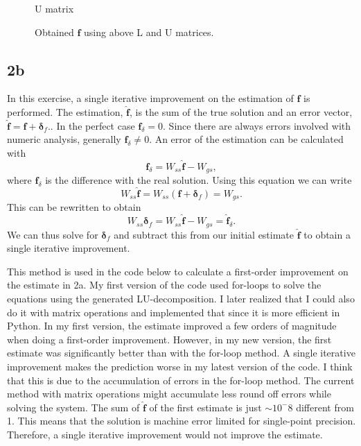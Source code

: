 \begin{figure}[!ht]
    \centering
    
    \caption{U matrix}
    \label{fig:2a_U}
\end{figure}

\begin{figure}[!ht]
    \centering
    
    \caption{Obtained $\mathbf{f}$ using above L and U matrices.}
    \label{fig:2a_f}
\end{figure}

\newpage

\subsection*{2b}
In this exercise, a single iterative improvement on the estimation of $\mathbf{f}$ is performed. The estimation, $\hat{\mathbf{f}}$, is the sum of the true solution and an error vector, $\hat{\mathbf{f}} = \mathbf{f} + \mathbf{\delta}_f.$. In the perfect case $\mathbf{f}_\delta=0$. Since there are always errors involved with numeric analysis, generally $\mathbf{f}_\delta\neq 0$. An error of the estimation can be calculated with
\begin{equation}
    \mathbf{f}_\delta = W_{ss}\mathbf{\hat{f}} - W_{gs},
\end{equation}
where $\mathbf{f}_\delta$ is the difference with the real solution. Using this equation we can write
\begin{equation}
    W_{ss}\hat{\mathbf{f}} = W_{ss}(\mathbf{f} + \mathbf{\delta}_f) = W_{gs}.
\end{equation}
This can be rewritten to obtain
\begin{equation}
    W_{ss}\mathbf{\delta}_f = W_{ss}\mathbf{\hat{f}} - W_{gs} = \hat{\mathbf{f}}_\delta.
\end{equation}
We can thus solve for $\mathbf{\delta}_f$ and subtract this from our initial estimate $\hat{\mathbf{f}}$ to obtain a single iterative improvement.

This method is used in the code below to calculate a first-order improvement on the estimate in 2a. My first version of the code used for-loops to solve the equations using the generated LU-decomposition. I later realized that I could also do it with matrix operations and implemented that since it is more efficient in Python. In my first version, the estimate improved a few orders of magnitude when doing a first-order improvement. However, in my new version, the first estimate was significantly better than with the for-loop method. A single iterative improvement makes the prediction worse in my latest version of the code. I think that this is due to the accumulation of errors in the for-loop method. The current method with matrix operations might accumulate less round off errors while solving the system. The sum of $\hat{\mathbf{f}}$ of the first estimate is just $\sim 10^-8$ different from 1. This means that the solution is machine error limited for single-point precision. Therefore, a single iterative improvement would not improve the estimate.

